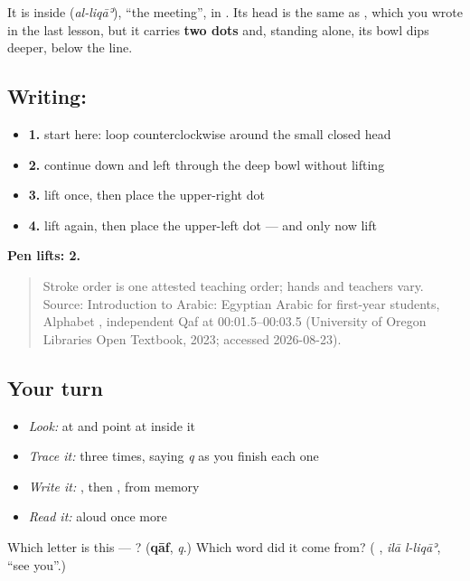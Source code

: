 It is inside \textbf{} (\emph{al-liqāʾ}), \textquotedblleft{}the meeting\textquotedblright{}, in \textbf{ }. Its head is the same as \textbf{}, which you wrote in the last lesson, but it carries \textbf{two dots} and, standing alone, its bowl dips deeper, below the line.

\subsection*{Writing: }

\begin{itemize}
\raggedright
  \item \textbf{1.} start here: loop counterclockwise around the small closed head
  \item \textbf{2.} continue down and left through the deep bowl without lifting
  \item \textbf{3.} lift once, then place the upper-right dot
  \item \textbf{4.} lift again, then place the upper-left dot — and only now lift
\end{itemize}

\textbf{Pen lifts: 2.}

\begin{quote}
Stroke order is one attested teaching order; hands and teachers vary. Source: Introduction to Arabic: Egyptian Arabic for first-year students, Alphabet  , independent Qaf at 00:01.5–00:03.5 (University of Oregon Libraries Open Textbook, 2023; accessed 2026-08-23).
\end{quote}

\subsection*{Your turn}
\begin{itemize}
\raggedright
  \item \emph{Look:} at \textbf{ } and point at  inside it
  \item \emph{Trace it:}  three times, saying \emph{q} as you finish each one
  \item \emph{Write it:} , then , from memory
  \item \emph{Read it:} \textbf{ } aloud once more
\end{itemize}

\begin{tcolorbox}[breakable,colback=teal!4,colframe=teal!35!black,title={Before you move on}]
Which letter is this — ? (\textbf{qāf}, \emph{q}.) Which word did it come from? (\textbf{ }, \emph{ilā l-liqāʾ}, \textquotedblleft{}see you\textquotedblright{}.)
\end{tcolorbox}
